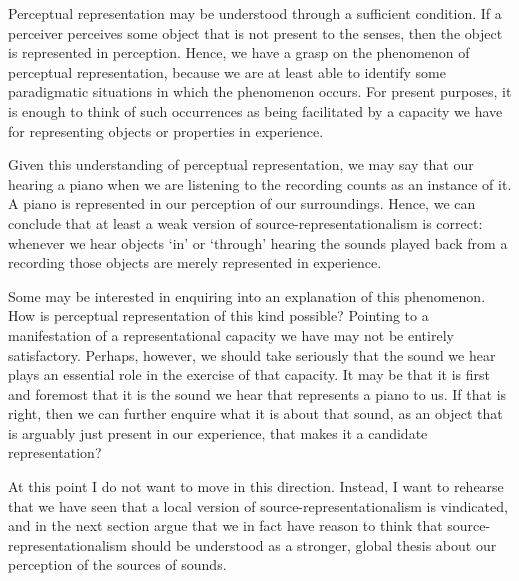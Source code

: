 \documentclass[sloppy, journal, git, bytitle, dodraft]{humapap}
\begin{document}
\sect Perceptual representation may be understood through a sufficient condition. If a perceiver perceives some object that is not present to the senses, then the object is represented in perception. Hence, we have a grasp on the phenomenon of perceptual representation, because we are at least able to identify some paradigmatic situations in which the phenomenon occurs. For present purposes, it is enough to think of such occurrences as being facilitated by a capacity we have for representing objects or properties in experience. 

Given this understanding of perceptual representation, we may say that our hearing a piano when we are listening to the recording counts as an instance of it. A piano is represented in our perception of our surroundings. Hence, we can conclude that at least a weak version of source-representationalism is correct: whenever we hear objects `in' or `through' hearing the sounds played back from a recording those objects are merely represented in experience. 

Some may be interested in enquiring into an explanation of this phenomenon. How is perceptual representation of this kind possible? Pointing to a manifestation of a representational capacity we have may not be entirely satisfactory. Perhaps, however, we should take seriously that the sound we hear plays an essential role in the exercise of that capacity. It may be that it is first and foremost that it is the sound we hear that represents a piano to us. If that is right, then we can further enquire what it is about that sound, as an object that is arguably just present in our experience, that makes it a candidate representation? 

At this point I do not want to move in this direction. Instead, I want to rehearse that we have seen that a local version of source-representationalism is vindicated, and in the next section argue that we in fact have reason to think that source-representationalism should be understood as a stronger, global thesis about our perception of the sources of sounds. 
\end{document}
